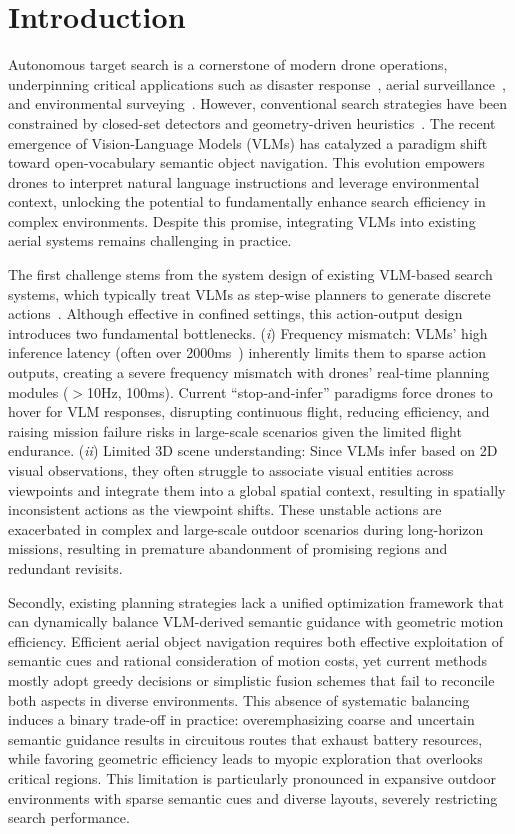 \vspace{-15pt}
\section{Introduction}\label{I}
Autonomous target search is a cornerstone of modern drone operations, underpinning critical applications such as disaster response~\cite{schedl2021autonomous}, aerial surveillance~\cite{sun2024moving}, and environmental surveying~\cite{geng2025epic}. 
However, conventional search strategies have been constrained by closed-set detectors and geometry-driven heuristics~\cite{luo2024star,schedl2021autonomous}. The recent emergence of Vision-Language Models (VLMs) has catalyzed a paradigm shift toward open-vocabulary semantic object navigation. This evolution empowers drones to interpret natural language instructions and leverage environmental context, unlocking the potential to fundamentally enhance search efficiency in complex environments.
Despite this promise, integrating VLMs into existing aerial systems remains challenging in practice.

The first challenge stems from the system design of existing VLM-based search systems, which typically treat VLMs as step-wise planners to generate discrete actions~\cite{ji2025towards,xiao2025uav}. Although effective in confined settings, this action-output design introduces two fundamental bottlenecks. 
(\textit{i}) Frequency mismatch: VLMs' high inference latency (often over 2000ms~\cite{wang2025uav}) inherently limits them to sparse action outputs, creating a severe frequency mismatch with drones' real-time planning modules ($>$10Hz, 100ms). Current ``stop-and-infer'' paradigms force drones to hover for VLM responses, disrupting continuous flight, reducing efficiency, and raising mission failure risks in large-scale scenarios given the limited flight endurance.
(\textit{ii}) Limited 3D scene understanding: Since VLMs infer based on 2D visual observations, they often struggle to associate visual entities across viewpoints and integrate them into a global spatial context, resulting in spatially inconsistent actions as the viewpoint shifts. These unstable actions are exacerbated in complex and large-scale outdoor scenarios during long-horizon missions, resulting in premature abandonment of promising regions and redundant revisits.

Secondly, existing planning strategies lack a unified optimization framework that can dynamically balance VLM-derived semantic guidance with geometric motion efficiency. Efficient aerial object navigation requires both effective exploitation of semantic cues and rational consideration of motion costs, yet current methods mostly adopt greedy decisions or simplistic fusion schemes that fail to reconcile both aspects in diverse environments. This absence of systematic balancing induces a binary trade-off in practice: overemphasizing coarse and uncertain semantic guidance results in circuitous routes that exhaust battery resources, while favoring geometric efficiency leads to myopic exploration that overlooks critical regions. This limitation is particularly pronounced in expansive outdoor environments with sparse semantic cues and diverse layouts, severely restricting search performance.

